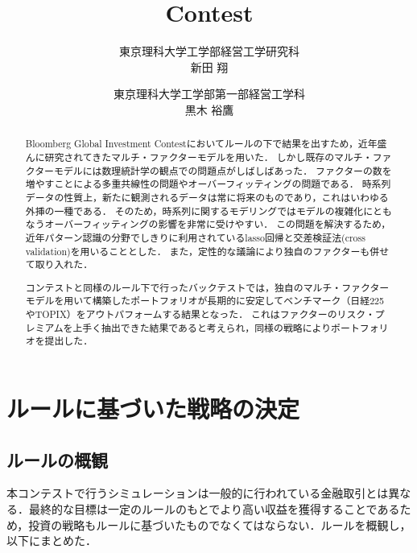\documentclass[11pt]{jreport}
\begin{document}
\title{Contest\\}
\author{東京理科大学工学部経営工学研究科\\新田 翔 \and 東京理科大学工学部第一部経営工学科\\黒木 裕鷹}
\maketitle
\begin{abstract}

Bloomberg Global Investment Contestにおいてルールの下で結果を出すため，近年盛んに研究されてきたマルチ・ファクターモデルを用いた．
しかし既存のマルチ・ファクターモデルには数理統計学の観点での問題点がしばしばあった．
ファクターの数を増やすことによる多重共線性の問題やオーバーフィッティングの問題である．
時系列データの性質上，新たに観測されるデータは常に将来のものであり，これはいわゆる外挿の一種である．
そのため，時系列に関するモデリングではモデルの複雑化にともなうオーバーフィッティングの影響を非常に受けやすい．
この問題を解決するため，近年パターン認識の分野でしきりに利用されているlasso回帰と交差検証法(cross validation)を用いることとした．
また，定性的な議論により独自のファクターも併せて取り入れた．

コンテストと同様のルール下で行ったバックテストでは，独自のマルチ・ファクターモデルを用いて構築したポートフォリオが長期的に安定してベンチマーク（日経225やTOPIX）をアウトパフォームする結果となった． 
これはファクターのリスク・プレミアムを上手く抽出できた結果であると考えられ，同様の戦略によりポートフォリオを提出した．
\end{abstract}



\chapter{ルールに基づいた戦略の決定}
\section{ルールの概観}

本コンテストで行うシミュレーションは一般的に行われている金融取引とは異なる．最終的な目標は一定のルールのもとでより高い収益を獲得することであるため，投資の戦略もルールに基づいたものでなくてはならない．ルールを概観し，以下にまとめた．
\end{document}
